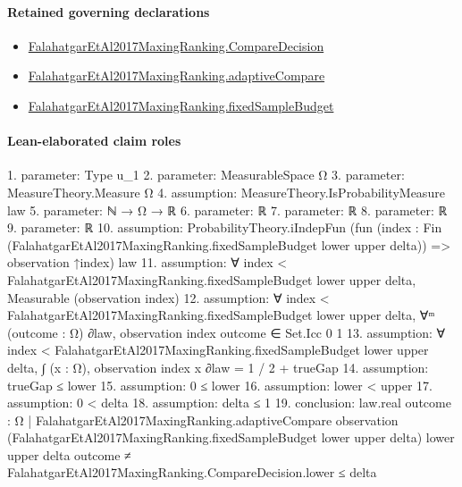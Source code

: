 \documentclass[10pt]{article}
\begin{document}
\paragraph{Retained governing declarations}
\begin{itemize}\raggedright
\item \hyperlink{governing-declaration-3723216c72fc3dc8}{Falahatgar\allowbreak{}Et\allowbreak{}Al2017\allowbreak{}Maxing\allowbreak{}Ranking.\allowbreak{}Compare\allowbreak{}Decision}
\item \hyperlink{paper-prerequisite-8b894f32c9664991}{Falahatgar\allowbreak{}Et\allowbreak{}Al2017\allowbreak{}Maxing\allowbreak{}Ranking.\allowbreak{}adaptive\allowbreak{}Compare}
\item \hyperlink{governing-declaration-4b4daf4bb2493573}{Falahatgar\allowbreak{}Et\allowbreak{}Al2017\allowbreak{}Maxing\allowbreak{}Ranking.\allowbreak{}fixed\allowbreak{}Sample\allowbreak{}Budget}
\end{itemize}
\paragraph{Lean-elaborated claim roles}\begin{ReviewVerbatim}
1. parameter: Type u_1
2. parameter: MeasurableSpace Ω
3. parameter: MeasureTheory.Measure Ω
4. assumption: MeasureTheory.IsProbabilityMeasure law
5. parameter: ℕ → Ω → ℝ
6. parameter: ℝ
7. parameter: ℝ
8. parameter: ℝ
9. parameter: ℝ
10. assumption: ProbabilityTheory.iIndepFun
  (fun (index : Fin (FalahatgarEtAl2017MaxingRanking.fixedSampleBudget lower upper delta)) => observation ↑index) law
11. assumption: ∀ index < FalahatgarEtAl2017MaxingRanking.fixedSampleBudget lower upper delta, Measurable (observation index)
12. assumption: ∀ index < FalahatgarEtAl2017MaxingRanking.fixedSampleBudget lower upper delta,
  ∀ᵐ (outcome : Ω) ∂law, observation index outcome ∈ Set.Icc 0 1
13. assumption: ∀ index < FalahatgarEtAl2017MaxingRanking.fixedSampleBudget lower upper delta,
  ∫ (x : Ω), observation index x ∂law = 1 / 2 + trueGap
14. assumption: trueGap ≤ lower
15. assumption: 0 ≤ lower
16. assumption: lower < upper
17. assumption: 0 < delta
18. assumption: delta ≤ 1
19. conclusion: law.real
    {outcome : Ω |
      FalahatgarEtAl2017MaxingRanking.adaptiveCompare observation
          (FalahatgarEtAl2017MaxingRanking.fixedSampleBudget lower upper delta) lower upper delta outcome ≠
        FalahatgarEtAl2017MaxingRanking.CompareDecision.lower} ≤
  delta
\end{ReviewVerbatim}
\end{document}

